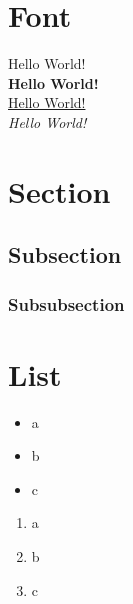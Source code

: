 \documentclass[10pt]{article}
\begin{document}
\section{Font}
\noindent
Hello World!\\
\textbf{Hello World!}\\ 
\underline{Hello World!}\\ 
\textit{Hello World!}
\section{Section}
    \subsection{Subsection}
		\subsubsection{Subsubsection}
		    
\section{List}
    \begin{itemize}
        \item a
        \item b  
        \item c
    \end{itemize}
    \begin{enumerate}
        \item a
        \item b
        \item c
    \end{enumerate}
\end{document}
